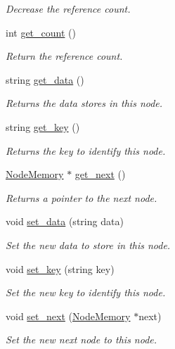 \begin{DoxyCompactItemize}
\begin{DoxyCompactList}\small\item\em Decrease the reference count. \end{DoxyCompactList}\item 
int \hyperlink{classNodeMemory_ad2f4cbd246f408da4c051fceb2890a57}{get\+\_\+count} ()
\begin{DoxyCompactList}\small\item\em Return the reference count. \end{DoxyCompactList}\item 
string \hyperlink{classNodeMemory_ad23733e415b5f462c4185fd92b909dba}{get\+\_\+data} ()
\begin{DoxyCompactList}\small\item\em Returns the data stores in this node. \end{DoxyCompactList}\item 
string \hyperlink{classNodeMemory_ab186845f7c255219425e207fb862e855}{get\+\_\+key} ()
\begin{DoxyCompactList}\small\item\em Returns the key to identify this node. \end{DoxyCompactList}\item 
\hyperlink{classNodeMemory}{Node\+Memory} $\ast$ \hyperlink{classNodeMemory_afc92c743c5627c4b22c85e5faf9eee84}{get\+\_\+next} ()
\begin{DoxyCompactList}\small\item\em Returns a pointer to the next node. \end{DoxyCompactList}\item 
void \hyperlink{classNodeMemory_af221c818d344d335281989e6952ee69c}{set\+\_\+data} (string data)
\begin{DoxyCompactList}\small\item\em Set the new data to store in this node. \end{DoxyCompactList}\item 
void \hyperlink{classNodeMemory_a536461389e3c5e82a011b5053ef506b7}{set\+\_\+key} (string key)
\begin{DoxyCompactList}\small\item\em Set the new key to identify this node. \end{DoxyCompactList}\item 
void \hyperlink{classNodeMemory_ae9e50169fa629797833332498915ea99}{set\+\_\+next} (\hyperlink{classNodeMemory}{Node\+Memory} $\ast$next)
\begin{DoxyCompactList}\small\item\em Set the new next node to this node. \end{DoxyCompactList}\item 

\end{DoxyCompactItemize}

